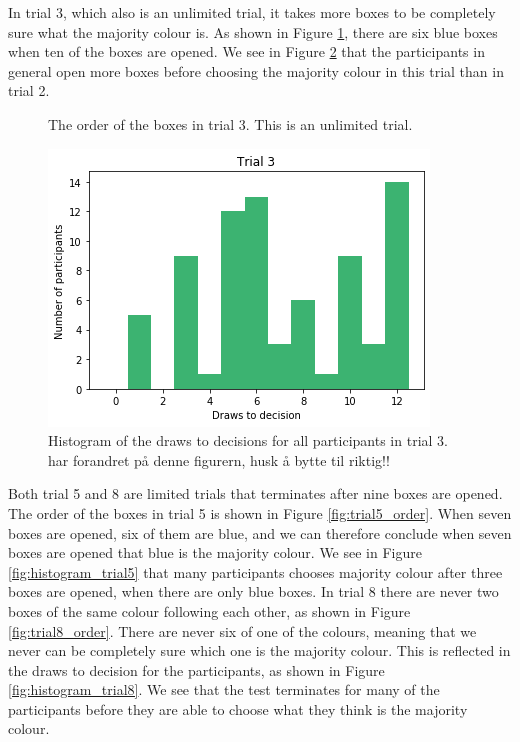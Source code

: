 In trial 3, which also is an unlimited trial, it takes more boxes to be completely sure what the majority colour is. As shown in Figure \ref{fig:trial3_order}, there are six blue boxes when ten of the boxes are opened. We see in Figure \ref{fig:histogram_trial3} that the participants in general open more boxes before choosing the majority colour in this trial than in trial 2. 

\begin{figure}
    \centering
    \scalebox{0.8}{}
    \caption[Order of boxes in trial 3]{The order of the boxes in trial 3. This is an unlimited trial.}
    \label{fig:trial3_order}
\end{figure}

\begin{figure}
    \centering
    \includegraphics[scale=0.6]{pictures/dtd3_histogram.png}
    \caption[Draws to decisions in trial 3]{Histogram of the draws to decisions for all participants in trial 3. 
    har forandret på denne figurern, husk å bytte til riktig!!}
    \label{fig:histogram_trial3}
\end{figure}

Both trial 5 and 8 are limited trials that terminates after nine boxes are opened. The order of the boxes in trial 5 is shown in Figure \ref{fig:trial5_order}. When seven boxes are opened, six of them are blue, and we can therefore conclude when seven boxes are opened that blue is the majority colour. We see in Figure \ref{fig:histogram_trial5} that many participants chooses majority colour after three boxes are opened, when there are only blue boxes. In trial 8 there are never two boxes of the same colour following each other, as shown in Figure \ref{fig:trial8_order}. There are never six of one of the colours, meaning that we never can be completely sure which one is the majority colour. This is reflected in the draws to decision for the participants, as shown in Figure \ref{fig:histogram_trial8}. We see that the test terminates for many of the participants before they are able to choose what they think is the majority colour. 

